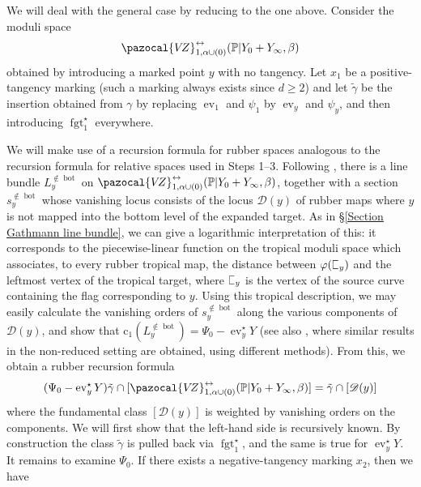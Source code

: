 \documentclass[11pt]{amsart}
\newcommand{\sqC}{\scalebox{0.8}[1.3]{$\sqsubset$}}
\newcommand{\VZ}{\pazocal{V\!Z}}
\newcommand{\st}{\star}
\newcommand{\ev}{\operatorname{ev}}
\newcommand{\fgt}{\operatorname{fgt}}
\newcommand{\Dcal}{\mathcal{D}}
\newcommand{\cchern}{\mathrm{c}}
\theoremstyle{definition}
\theoremstyle{definition}
\begin{document}
We will deal with the general case by reducing to the one above. Consider the moduli space
\begin{equation*}\label{step 4 recursion space} \VZ^{\leftrightarrow}_{1,\alpha\cup (0)}(\mathbb P|Y_0+Y_\infty,\beta)\end{equation*}
obtained by introducing a marked point $y$ with no tangency. Let $x_1$ be a positive-tangency marking (such a marking always exists since $d \geq 2$) and let $\tilde\gamma$ be the insertion obtained from $\gamma$ by replacing $\ev_1$ and $\psi_1$ by $\ev_y$ and $\psi_y$, and then introducing $\fgt_{1}^\st$ everywhere.

We will make use of a recursion formula for rubber spaces analogous to the recursion formula for relative spaces used in Steps 1--3. Following \cite{EKatz}, there is a line bundle $L_y^{\not\in \operatorname{bot}}$ on $\VZ^{\leftrightarrow}_{1,\alpha\cup (0)}(\mathbb P|Y_0+Y_\infty,\beta)$, together with a section $s_y^{\not\in\operatorname{bot}}$ whose vanishing locus consists of the locus $\Dcal(y)$ of rubber maps where $y$ is not mapped into the bottom level of the expanded target. As in \S \ref{Section Gathmann line bundle}, we can give a logarithmic interpretation of this: it corresponds to the piecewise-linear function on the tropical moduli space which associates, to every rubber tropical map, the distance between $\varphi(\sqC_y)$ and the leftmost vertex of the tropical target, where $\sqC_y$ is the vertex of the source curve containing the flag corresponding to $y$. Using this tropical description, we may easily calculate the vanishing orders of $s_y^{\not\in\operatorname{bot}}$ along the various components of $\Dcal(y)$, and show that $\cchern_1(L_y^{\not\in\operatorname{bot}}) = \Psi_0 - \ev_y^\st Y$ (see also \cite{EKatzLB}, where similar results in the non-reduced setting are obtained, using different methods). From this, we obtain a rubber recursion formula
\begin{equation}\label{step 4 recursion} (\Psi_0 - \ev_y^\st Y) \tilde\gamma \cap [\VZ^{\leftrightarrow}_{1,\alpha\cup(0)}(\mathbb P|Y_0+Y_\infty,\beta)] = \tilde\gamma \cap [\Dcal(y)]\end{equation}
where the fundamental class $[\Dcal(y)]$ is weighted by vanishing orders on the components. We will first show that the left-hand side is recursively known. By construction the class $\tilde\gamma$ is pulled back via $\fgt_{1}^\st$, and the same is true for $\ev_y^\st Y$. It remains to examine $\Psi_0$. If there exists a negative-tangency marking $x_2$, then we have \cite[Construction 5.1.17]{GathmannThesis}
\end{document}
